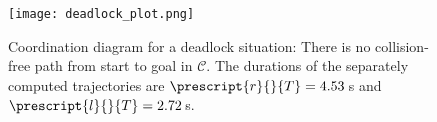 \documentclass{article}
\newcommand{\ltau}{\prescript{l}{}{T}}
\newcommand{\rtau}{\prescript{r}{}{T}}
\begin{document}
\begin{figure}[htbp]
    \centering
    \texttt{[image: deadlock\_plot.png]} %
    \caption{Coordination diagram for a deadlock situation: There is no collision-free path from start to goal in $\mathcal{C}$. The durations of the separately computed trajectories are $\rtau = 4.53$\,s and $\ltau = 2.72$\,s.}
    \label{fig:deadlock_diagram}
\end{figure}
\end{document}
